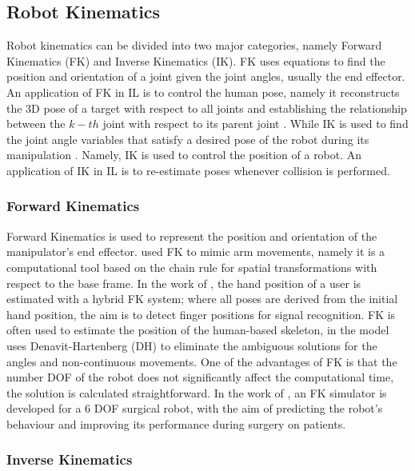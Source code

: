 \documentclass[thesis]{mas_proposal}
\begin{document}
	\subsection{Robot Kinematics}
	
		Robot kinematics can be divided into two major categories, namely Forward Kinematics (FK) and Inverse Kinematics (IK). FK uses equations to find the position and orientation of a joint given the joint angles, usually the end effector. An application of FK in IL is to control the human pose, namely it reconstructs the 3D pose of a target with respect to all joints and establishing the relationship between the $k-th$ joint with respect to its parent joint \cite{Li2021}. While IK is used to find the joint angle variables that satisfy a desired pose of the robot during its manipulation \cite{Hayat2015}. Namely, IK is used to control the position of a robot. An application of IK in IL is to re-estimate poses whenever collision is performed.
		
	\subsubsection{Forward Kinematics}
	
		Forward Kinematics is used to represent the position and orientation of the manipulator's end effector. \cite{Assad2020} used FK to mimic arm movements, namely it is a computational tool based on the chain rule for spatial transformations with respect to the base frame. In the work of \cite{Malik2017}, the hand position of a user is estimated with a hybrid FK system; where all poses are derived from the initial hand position, the aim is to detect finger positions for signal recognition. FK is often used to estimate the position of the human-based skeleton, in \cite{Huang2022} the model uses Denavit-Hartenberg (DH) to eliminate the ambiguous solutions for the angles and non-continuous movements. One of the advantages of FK is that the number DOF of the robot does not significantly affect the computational time, the solution is calculated straightforward. In the work of \cite{Shao2015}, an FK simulator is developed for a 6 DOF surgical robot, with the aim of predicting the robot's behaviour and improving its performance during surgery on patients.
	
	\subsubsection{Inverse Kinematics}
	
\end{document}
